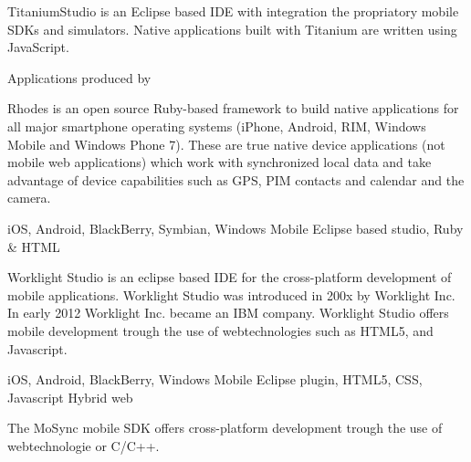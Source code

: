 TitaniumStudio is an Eclipse based IDE with integration the propriatory mobile SDKs and simulators. Native applications built with Titanium are written using JavaScript.

Applications produced by %

Rhodes is an open source Ruby-based framework to build native applications for all major smartphone operating systems (iPhone, Android, RIM, Windows Mobile and Windows Phone 7). These are true native device applications (not mobile web applications) which work with synchronized local data and take advantage of device capabilities such as GPS, PIM contacts and calendar and the camera. %

iOS, Android, BlackBerry, Symbian, Windows Mobile
Eclipse based studio, Ruby \& HTML


Worklight Studio is an eclipse based IDE for the cross-platform development of mobile applications. Worklight Studio was introduced in 200x by Worklight Inc. In early 2012 Worklight Inc. became an IBM company. Worklight Studio offers mobile development trough the use of webtechnologies such as HTML5, and Javascript.

iOS, Android, BlackBerry, Windows Mobile	
Eclipse plugin, HTML5, CSS, Javascript
Hybrid web

The MoSync mobile SDK offers cross-platform development trough the use of webtechnologie or C/C++.

















